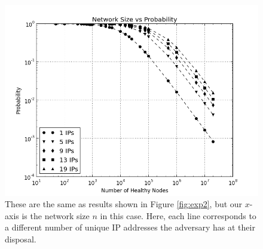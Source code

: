 \begin{figure}
	\centering
	\includegraphics[width=0.7\linewidth]{figs/size_prob_all}
	\caption[Simulation results from a different perspective]{These are the same as results shown in Figure \ref{fig:exp2}, but our $x$-axis is the network size $n$ in this case.  
		Here, each line corresponds to a different number of unique IP addresses the adversary has at their disposal.}
	\label{fig:size_prob_all}
\end{figure}



